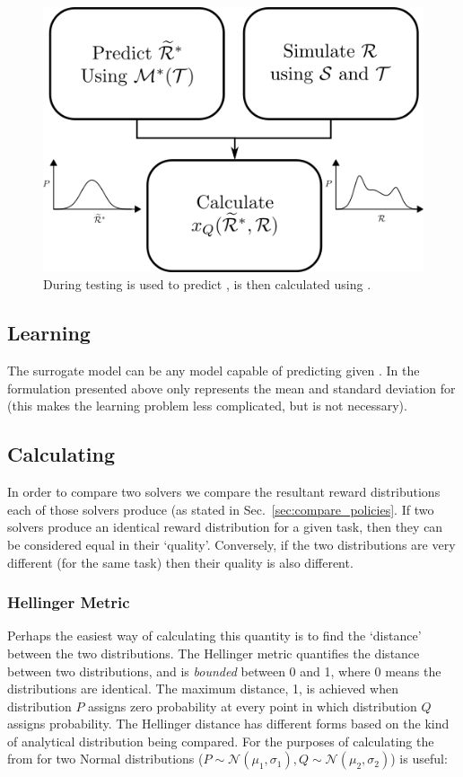 \begin{figure}[tb]
    \centering
    \includegraphics[width=0.6\linewidth]{Figures/SQ_test.png}
    \caption{During testing \surrogate{} is used to predict \rwdstarapprox{}, \xQ{} is then calculated using \rwd{}.}
    \label{fig:sq_test}
\end{figure}

\subsection{Learning \surrogate}
The surrogate model \surrogate{} can be any model capable of predicting \rwdstarapprox{} given \task. In the formulation presented above \rwdstariapprox{} only represents the mean and standard deviation for \rwdstari{} (this makes the learning problem less complicated, but is not necessary).

\subsection{Calculating \xQ}
In order to compare two solvers we compare the resultant reward distributions each of those solvers produce (as stated in Sec.~\ref{sec:compare_policies}. If two solvers produce an identical reward distribution for a given task, then they can be considered equal in their `quality'. Conversely, if the two distributions are very different (for the same task) then their quality is also different.

\subsubsection{Hellinger Metric} \label{sec:hellinger}
Perhaps the easiest way of calculating this quantity is to find the `distance' between the two distributions. The Hellinger metric quantifies the distance between two distributions, and is \emph{bounded} between 0 and 1, where 0 means the distributions are identical. The maximum distance, 1, is achieved when distribution $P$ assigns zero probability at every point in which distribution $Q$ assigns probability.  The Hellinger distance has different forms based on the kind of analytical distribution being compared. For the purposes of calculating \xQ{} the from for two Normal distributions ($P \sim \mathcal{N}(\mu_1,\sigma_1), Q\sim\mathcal{N}(\mu_2,\sigma_2)$) is useful:


